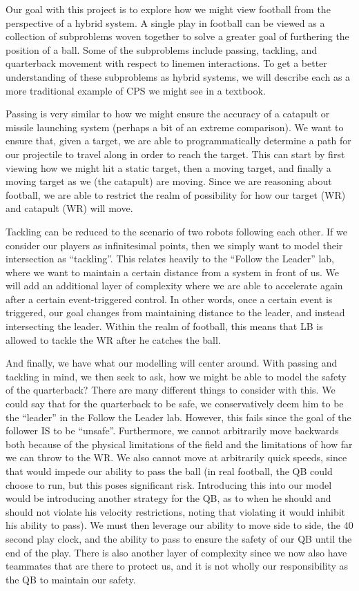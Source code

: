 Our goal with this project is to explore how we might view football from the perspective of a hybrid system. A single play in football can be viewed as a collection of subproblems woven together to solve a greater goal of furthering the position of a ball. Some of the subproblems include passing, tackling, and quarterback movement with respect to linemen interactions. To get a better understanding of these subproblems as hybrid systems, we will describe each as a more traditional example of CPS we might see in a textbook.

Passing is very similar to how we might ensure the accuracy of a catapult or missile launching system (perhaps a bit of an extreme comparison). We want to ensure that, given a target, we are able to programmatically determine a path for our projectile to travel along in order to reach the target. This can start by first viewing how we might hit a static target, then a moving target, and finally a moving target as we (the catapult) are moving. Since we are reasoning about football, we are able to restrict the realm of possibility for how our target (WR) and catapult (WR) will move. 

Tackling can be reduced to the scenario of two robots following each other. If we consider our players as infinitesimal points, then we simply want to model their intersection as “tackling”. This relates heavily to the “Follow the Leader” lab, where we want to maintain a certain distance from a system in front of us. We will add an additional layer of complexity where we are able to accelerate again after a certain event-triggered control. In other words, once a certain event is triggered, our goal changes from maintaining distance to the leader, and instead intersecting the leader. Within the realm of football, this means that LB is allowed to tackle the WR after he catches the ball.

And finally, we have what our modelling will center around. With passing and tackling in mind, we then seek to ask, how we might be able to model the safety of the quarterback? There are many different things to consider with this. We could say that for the quarterback to be safe, we conservatively deem him to be the “leader” in the Follow the Leader lab. However, this fails since the goal of the follower IS to be “unsafe”. Furthermore, we cannot arbitrarily move backwards both because of the physical limitations of the field and the limitations of how far we can throw to the WR. We also cannot move at arbitrarily quick speeds, since that would impede our ability to pass the ball (in real football, the QB could choose to run, but this poses significant risk. Introducing this into our model would be introducing another strategy for the QB, as to when he should and should not violate his velocity restrictions, noting that violating it would inhibit his ability to pass). We must then leverage our ability to move side to side, the 40 second play clock, and the ability to pass to ensure the safety of our QB until the end of the play. There is also another layer of complexity since we now also have teammates that are there to protect us, and it is not wholly our responsibility as the QB to maintain our safety.

